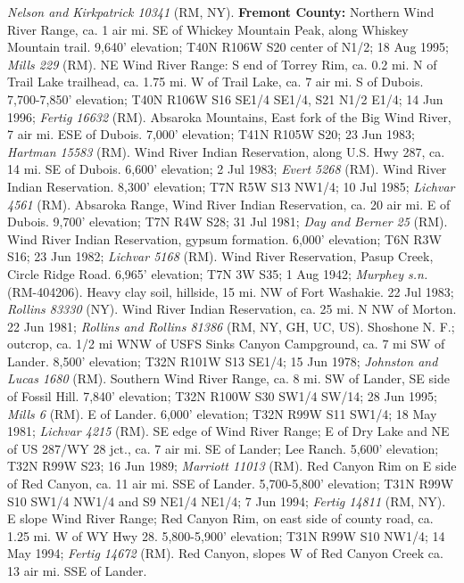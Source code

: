 \textit{Nelson and Kirkpatrick 10341} (RM, NY).
  \textbf{Fremont County:}
Northern Wind River Range, ca. 1 air mi. SE of Whickey Mountain Peak, along
Whiskey Mountain trail. 9,640' elevation; T40N R106W S20 center of N1/2;
18 Aug 1995; \textit{Mills 229} (RM).
NE Wind River Range: S end of Torrey Rim, ca. 0.2 mi. N of Trail Lake trailhead,
ca. 1.75 mi. W of Trail Lake, ca. 7 air mi. S of Dubois. 7,700-7,850' elevation;
T40N R106W S16 SE1/4 SE1/4, S21 N1/2 E1/4; 14 Jun 1996;
\textit{Fertig 16632} (RM).
Absaroka Mountains, East fork of the Big Wind River, 7 air mi. ESE of Dubois.
7,000' elevation; T41N R105W S20; 23 Jun 1983; \textit{Hartman 15583} (RM).
Wind River Indian Reservation, along U.S. Hwy 287, ca. 14 mi. SE of Dubois.
6,600' elevation; 2 Jul 1983; \textit{Evert 5268} (RM).
Wind River Indian Reservation. 8,300' elevation; T7N R5W S13 NW1/4; 10 Jul 1985;
\textit{Lichvar 4561} (RM).
Absaroka Range, Wind River Indian Reservation, ca. 20 air mi. E of Dubois.
9,700' elevation; T7N R4W S28; 31 Jul 1981; \textit{Day and Berner 25} (RM).
Wind River Indian Reservation, gypsum formation. 6,000' elevation; T6N R3W S16;
23 Jun 1982; \textit{Lichvar 5168} (RM).
Wind River Reservation, Pasup Creek, Circle Ridge Road. 6,965' elevation;
T7N 3W S35; 1 Aug 1942; \textit{Murphey s.n.} (RM-404206).
Heavy clay soil, hillside, 15 mi. NW of Fort Washakie. 22 Jul 1983;
\textit{Rollins 83330} (NY).
Wind River Indian Reservation, ca. 25 mi. N NW of Morton. 22 Jun 1981; 
\textit{Rollins and Rollins 81386} (RM, NY, GH, UC, US).
Shoshone N. F.; outcrop, ca. 1/2 mi WNW of USFS Sinks Canyon Campground, ca.
7 mi SW of Lander. 8,500' elevation; T32N R101W S13 SE1/4; 15 Jun 1978;
\textit{Johnston and Lucas 1680} (RM).
Southern Wind River Range, ca. 8 mi. SW of Lander, SE side of Fossil Hill.
7,840' elevation; T32N R100W S30 SW1/4 SW/14; 28 Jun 1995;
\textit{Mills 6} (RM).
E of Lander. 6,000' elevation; T32N R99W S11 SW1/4; 18 May 1981;
\textit{Lichvar 4215} (RM).
SE edge of Wind River Range; E of Dry Lake and NE of US 287/WY 28 jct., ca. 7
air mi. SE of Lander; Lee Ranch. 5,600' elevation; T32N R99W S23; 16 Jun 1989;
\textit{Marriott 11013} (RM).
Red Canyon Rim on E side of Red Canyon, ca. 11 air mi. SSE of Lander.
5,700-5,800' elevation; T31N R99W S10 SW1/4 NW1/4 and S9 NE1/4 NE1/4;
7 Jun 1994; \textit{Fertig 14811} (RM, NY).
E slope Wind River Range; Red Canyon Rim, on east side of county road, ca. 1.25
mi. W of WY Hwy 28. 5,800-5,900' elevation; T31N R99W S10 NW1/4; 14 May 1994;
\textit{Fertig 14672} (RM).
Red Canyon, slopes W of Red Canyon Creek ca. 13 air mi. SSE of Lander.
